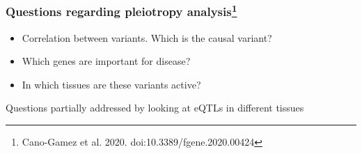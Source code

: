 \documentclass{beamer}
\begin{document}
    \begin{frame}
        \frametitle{Questions regarding pleiotropy analysis\footnote{Cano-Gamez et al. 2020. doi:10.3389/fgene.2020.00424}}



%
        \begin{itemize}
            \item Correlation between variants. Which is the causal variant?
            \item Which genes are important for disease?
            \item In which tissues are these variants active?
        \end{itemize}
%
        \vfill
%
        Questions partially addressed by looking at eQTLs in different tissues

    \end{frame}
\end{document}
